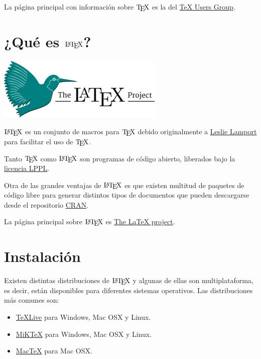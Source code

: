 \documentclass[
  a4paper,
]{scrreport}
\providecommand{\tightlist}{%
  \setlength{\itemsep}{0pt}\setlength{\parskip}{0pt}}\usepackage{longtable,booktabs,array}
\begin{document}
La página principal con información sobre \(\text{\TeX}\) es la del
\href{https://www.tug.org/}{TeX Users Group}.

\hypertarget{quuxe9-es-textlatex}{%
\section{\texorpdfstring{¿Qué es
\(\text{\LaTeX}\)?}{¿Qué es \textbackslash text\{\textbackslash LaTeX\}?}}\label{quuxe9-es-textlatex}}

\includegraphics{./img/logos/latex-project-logo.png}

\(\text{\LaTeX}\) es un conjunto de macros para \(\text{\TeX}\) debido
originalmente a
\href{https://en.wikipedia.org/wiki/Leslie_Lamport}{Leslie Lamport} para
facilitar el uso de \(\text{\TeX}\).

Tanto \(\text{\TeX}\) como \(\text{\LaTeX}\) son programas de código
abierto, liberados bajo la
\href{https://www.latex-project.org/lppl.txt}{licencia LPPL}.

Otra de las grandes ventajas de \(\text{\LaTeX}\) es que existen
multitud de paquetes de código libre para generar distintos tipos de
documentos que pueden descargarse desde el repositorio
\href{https://ctan.org/}{CRAN}.

La página principal sobre \(\text{\LaTeX}\) es
\href{https://www.latex-project.org/}{The LaTeX project}.

\hypertarget{instalaciuxf3n}{%
\section{Instalación}\label{instalaciuxf3n}}

Existen distintas distribuciones de \(\text{\LaTeX}\) y algunas de ellas
son multiplataforma, es decir, están disponibles para diferentes
sistemas operativos. Las distribuciones más comunes son:

\begin{itemize}
\tightlist
\item
  \href{https://tug.org/texlive/}{TeXLive} para Windows, Mac OSX y
  Linux.
\item
  \href{}{MiKTeX} para Windows, Mac OSX y Linux.
\item
  \href{https://www.tug.org/mactex/}{MacTeX} para Mac OSX.
\end{itemize}
\end{document}

